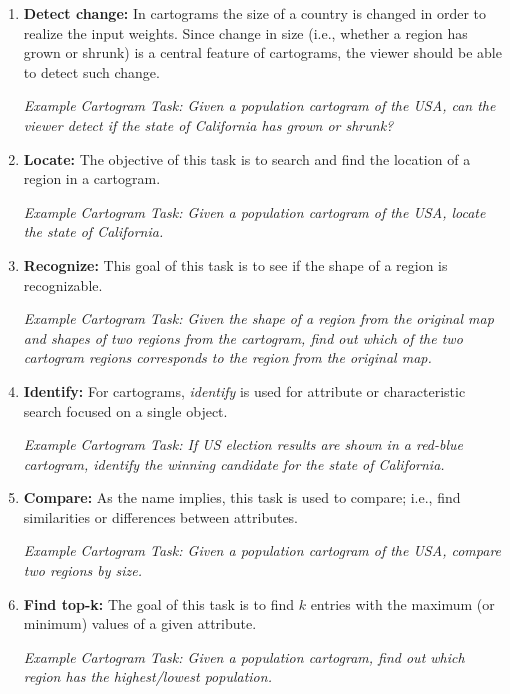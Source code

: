 \documentclass{egpubl}
\begin{document}
\begin{enumerate}[1.]
\item \textbf{Detect change:} 
In cartograms the size of a country is changed in order to realize the input weights. Since change in size (i.e., whether a region has grown or shrunk) is a central feature of cartograms, the viewer should be able to detect such change. 


\textit{Example Cartogram Task: Given a population cartogram of the USA, can the viewer detect if the state of California has grown or shrunk?}

\item \textbf{Locate:} The objective of this task is to search and find the location of a region in a cartogram.



\textit{Example Cartogram Task: Given a population cartogram of the USA, locate the state of California.}

\item \textbf{Recognize:} This goal of this task is to see if the shape of a region is recognizable.



\textit{Example Cartogram Task: Given the shape of a region from the original map and shapes of two regions from the cartogram, find out which of the two cartogram regions corresponds to the region from the original map.}

\item \textbf{Identify:}
For cartograms, \textit{identify} is used for attribute or characteristic search focused on a single object.

\textit{Example Cartogram Task:  If US election results are shown in a red-blue cartogram, identify the winning candidate for the state of California.}

\item \textbf{Compare:}
As the name implies, this task is used to compare; i.e., find similarities or differences between attributes.


\textit{Example Cartogram Task:  Given a population cartogram of the USA, compare two regions by size.}


\item \textbf{Find top-k:}
 The goal of this task is to find $k$ entries with the maximum
 (or minimum) values of a given attribute.

\textit{Example Cartogram Task: Given a population cartogram, find out which region has the highest/lowest population. }



\end{enumerate}
\end{document}
